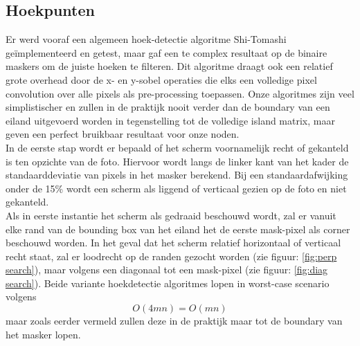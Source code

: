\subsection{Hoekpunten}
Er werd vooraf een algemeen hoek-detectie algoritme Shi-Tomashi \cite{shi-tomashi} geïmplementeerd en getest, maar gaf een te complex resultaat op de binaire maskers om de juiste hoeken te filteren. Dit algoritme draagt ook een relatief grote overhead door de x- en y-sobel operaties die elks een volledige pixel convolution over alle pixels als pre-processing toepassen. Onze algoritmes zijn veel simplistischer en zullen in de praktijk nooit verder dan de boundary van een eiland uitgevoerd worden in tegenstelling tot de volledige island matrix, maar geven een perfect bruikbaar resultaat voor onze noden.\\[3mm]
In de eerste stap wordt er bepaald of het scherm voornamelijk recht of gekanteld is ten opzichte van de foto. Hiervoor wordt langs de linker kant van het kader de standaarddeviatie van pixels in het masker berekend. Bij een standaardafwijking onder de 15\% wordt een scherm als liggend of verticaal gezien op de foto en niet gekanteld.\\[3mm]
Als in eerste instantie het scherm als gedraaid beschouwd wordt, zal er vanuit elke rand van de bounding box van het eiland het de eerste mask-pixel als corner beschouwd worden. In het geval dat het scherm relatief horizontaal of verticaal recht staat, zal er loodrecht op de randen gezocht worden (zie figuur: \ref{fig:perp search}), maar volgens een diagonaal tot een mask-pixel (zie figuur: \ref{fig:diag search}). Beide variante hoekdetectie algoritmes lopen in worst-case scenario volgens
\[O(4mn)=O(mn)\]
maar zoals eerder vermeld zullen deze in de praktijk maar tot de boundary van het masker lopen.

